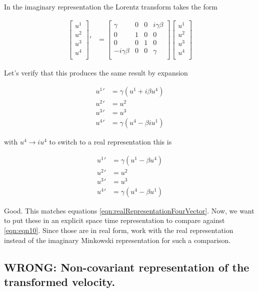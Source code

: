 \documentclass{article}
\begin{document}
In the imaginary representation the Lorentz transform takes the form

\begin{align*}
{\begin{bmatrix}
u^1 \\
u^2 \\
u^3 \\
u^4 \\
\end{bmatrix}}'
&=
\begin{bmatrix}
\gamma & 0 & 0 & i \gamma \beta \\
0 & 1 & 0 & 0 \\
0 & 0 & 1 & 0 \\
- i \gamma \beta & 0 & 0 & \gamma \\
\end{bmatrix}
{\begin{bmatrix}
u^1 \\
u^2 \\
u^3 \\
u^4 \\
\end{bmatrix}} 
\end{align*}

Let's verify that this produces the same result by expansion

\begin{align*}
{u^1}' &= \gamma ( u^1 + i \beta u^4) \\
{u^2}' &= {u^2} \\
{u^3}' &= {u^3} \\
{u^4}' &= \gamma ( u^4 - \beta i u^1)
\end{align*}

with $u^4 \rightarrow i u^4$ to switch to a real representation this is

\begin{align*}
{u^1}' &= \gamma ( u^1 - \beta u^4) \\
{u^2}' &= {u^2} \\
{u^3}' &= {u^3} \\
{u^4}' &= \gamma ( u^4 - \beta u^1)
\end{align*}

Good.  This matches equations \ref{eqn:realRepresentationFourVector}.  Now, we want to put these in an explicit space time representation
to compare against \ref{eqn:eqn10}.  Since those are in real form, work with the real representation instead of the imaginary Minkowski
representation for such a comparison.

\subsection{ WRONG: Non-covariant representation of the transformed velocity. }
\end{document}
